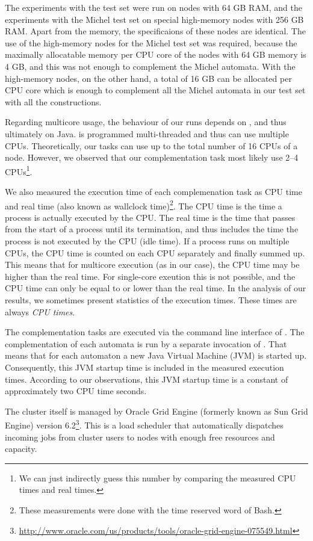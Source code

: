 The experiments with the \goal{} test set were run on nodes with 64 GB RAM, and the experiments with the Michel test set on special high-memory nodes with 256 GB RAM. Apart from the memory, the specificaions of these nodes are identical. The use of the high-memory nodes for the Michel test set was required, because the maximally allocatable memory per CPU core of the nodes with 64 GB memory is 4 GB, and this was not enough to complement the Michel automata. With the high-memory nodes, on the other hand, a total of 16 GB can be allocated per CPU core which is enough to complement all the Michel automata in our test set with all the constructions.

Regarding multicore usage, the behaviour of our runs depends on \goal, and thus ultimately on Java. \goal{} is programmed multi-threaded and thus can use multiple CPUs. Theoretically, our tasks can use up to the total number of 16 CPUs of a node. However, we observed that our \goal{} complementation task most likely use 2--4 CPUs\footnote{We can just indirectly guess this number by comparing the measured CPU times and real times.}.

We also measured the execution time of each complemenation task as CPU time and real time (also known as wallclock time)\footnote{These measurements were done with the \textsf{time} reserved word of Bash.}. The CPU time is the time a process is actually executed by the CPU. The real time is the time that passes from the start of a process until its termination, and thus includes the time the process is not executed by the CPU (idle time). If a process runs on multiple CPUs, the CPU time is counted on each CPU separately and finally summed up. This means that for multicore execution (as in our case), the CPU time may be higher than the real time. For single-core exeution this is not possible, and the CPU time can only be equal to or lower than the real time. In the analysis of our results, we sometimes present statistics of the execution times. These times are always \textit{CPU times}.

The complementation tasks are executed via the command line interface of \goal. The complementation of each automata is run by a separate invocation of \goal. That means that for each automaton a new Java Virtual Machine (JVM) is started up. Consequently, this JVM startup time is included in the measured execution times. According to our observations, this JVM startup time is a constant of approximately two CPU time seconds.

The cluster itself is managed by Oracle Grid Engine (formerly known as Sun Grid Engine) version 6.2\footnote{\url{http://www.oracle.com/us/products/tools/oracle-grid-engine-075549.html}}. This is a load scheduler that automatically dispatches incoming jobs from cluster users to nodes with enough free resources and capacity.

